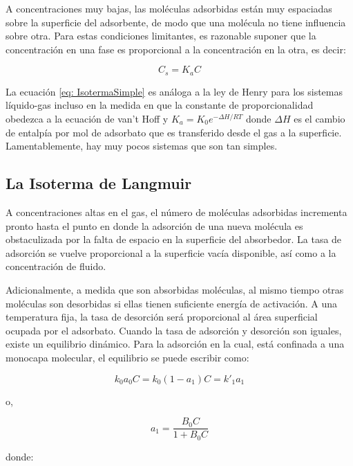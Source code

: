 \documentclass[11pt]{book}
\begin{document}
A concentraciones muy bajas, las moléculas adsorbidas están muy espaciadas sobre la superficie del adsorbente, de modo que una molécula no tiene influencia sobre otra. Para estas condiciones limitantes, es razonable suponer que la concentración en una fase es proporcional a la concentración en la otra, es decir:

\begin{equation}
    \label{eq: IsotermaSimple}
    C_s = K_a C
\end{equation}

La ecuación \ref{eq: IsotermaSimple} es análoga a la ley de Henry para los sistemas líquido-gas incluso en la medida en que la constante de proporcionalidad obedezca a la ecuación de van’t Hoff y $K_a=K_0 e^{-\Delta H/RT}$ donde $\Delta H$ es el cambio de entalpía por mol de adsorbato que es transferido desde el gas a la superficie. Lamentablemente, hay muy pocos sistemas que son tan simples.

\subsection{La Isoterma de Langmuir}

A concentraciones altas en el gas, el número de moléculas adsorbidas incrementa pronto hasta el punto en donde la adsorción de una nueva molécula es obstaculizada por la falta de espacio en la superficie del absorbedor. La tasa de adsorción se vuelve proporcional a la superficie vacía disponible, así como a la concentración de fluido.

Adicionalmente, a medida que son absorbidas moléculas, al mismo tiempo otras moléculas son desorbidas si ellas tienen suficiente energía de activación. A una temperatura fija, la tasa de desorción será proporcional al área superficial ocupada por el adsorbato. Cuando la tasa de adsorción y desorción son iguales, existe un equilibrio dinámico. Para la adsorción en la cual, está confinada a una monocapa molecular, el equilibrio se puede escribir como:

\begin{equation*}
    k_0 a_0 C = k_0 (1-a_1) C = k'_1 a_1
\end{equation*}

o,

\begin{equation}
    \label{eq:IsotermaLangmuir_1}
    a_1 = \frac{B_0 C}{1 + B_0 C}
\end{equation}

donde:
\end{document}
